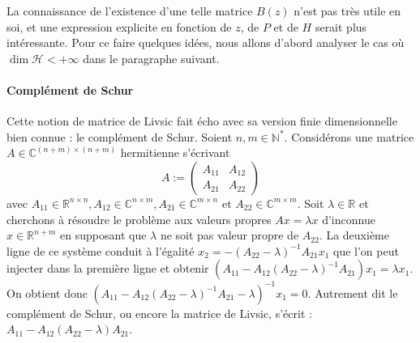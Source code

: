 \documentclass[12pt,openany,a4paper, titlepage]{article}
\newcommand{\lp}{\left(}
\newcommand{\rp}{\right)}
\newcommand{\R}{\mathbb{R}}
\newcommand{\C}{\mathbb{C}}
\newcommand{\N}{\mathbb{N}}
\newcommand{\HH}{\mathcal{H}}
\theoremstyle{definition}
\theoremstyle{definition}
\theoremstyle{definition}
\theoremstyle{definition}
\theoremstyle{definition}
\theoremstyle{definition}
\begin{document}
La connaissance de l'existence d'une telle matrice $B(z)$ n'est pas très utile en soi, et une expression explicite en fonction de $z$, de $P$ et de $H$ serait plus intéressante. Pour ce faire quelques idées, nous allons d'abord analyser le cas où $\dim \HH < +\infty$ dans le paragraphe suivant. 

\paragraph{Complément de Schur}
Cette notion de matrice de Livsic fait écho avec sa version finie dimensionnelle bien connue : le complément de Schur.  
Soient $n,m \in\N^*$. Considérons une matrice $A\in\C^{(n+m)\times (n+m)}$ hermitienne s'écrivant 
\begin{equation*}
    A:= \begin{pmatrix}
A_{11} & A_{12} \\
A_{21} & A_{22} 
\end{pmatrix}
\end{equation*}
avec $A_{11}\in\R^{n\times n},  A_{12}\in\C^{n\times m}, A_{21}\in\C^{m\times n}$ et $A_{22}\in\C^{m\times m}$. Soit $\lambda \in \R$ et cherchons à résoudre le problème aux valeurs propres $Ax = \lambda x$ d'inconnue $x\in\R^{n+m}$ en supposant que $\lambda$ ne soit pas valeur propre de $A_{22}$. La deuxième ligne de ce système conduit à l'égalité $x_2 = -(A_{22}-\lambda)^{-1}A_{21}x_1$ que l'on peut injecter dans la première ligne et obtenir $(A_{11} - A_{12}(A_{22}-\lambda)^{-1}A_{21})x_1 = \lambda x_1 $. On obtient donc $\lp A_{11} - A_{12}(A_{22}-\lambda)^{-1}A_{21} - \lambda  \rp^{-1} x_1 = 0$. Autrement dit le complément de Schur, ou encore la matrice de Livsic, s'écrit : $A_{11} - A_{12}(A_{22}-\lambda)A_{21}$. 
\end{document}
